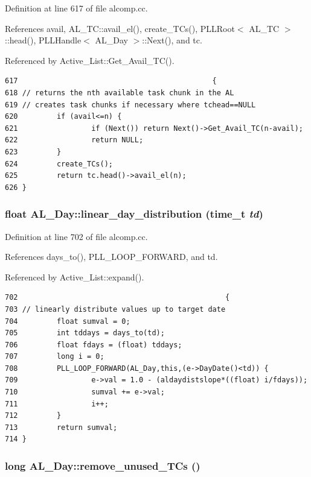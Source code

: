 Definition at line 617 of file alcomp.cc.

References avail, AL\_\-TC::avail\_\-el(), create\_\-TCs(), PLLRoot$<$ AL\_\-TC $>$::head(), PLLHandle$<$ AL\_\-Day $>$::Next(), and tc.

Referenced by Active\_\-List::Get\_\-Avail\_\-TC().



\footnotesize\begin{verbatim}617                                             {
618 // returns the nth available task chunk in the AL
619 // creates task chunks if necessary where tchead==NULL
620         if (avail<=n) {
621                 if (Next()) return Next()->Get_Avail_TC(n-avail);
622                 return NULL;
623         }
624         create_TCs();
625         return tc.head()->avail_el(n);
626 }
\end{verbatim}\normalsize 
{}
\subsubsection{\setlength{\rightskip}{0pt plus 5cm}float AL\_\-Day::linear\_\-day\_\-distribution (time\_\-t {\em td})}\label{classAL__Day_a26}




Definition at line 702 of file alcomp.cc.

References days\_\-to(), PLL\_\-LOOP\_\-FORWARD, and td.

Referenced by Active\_\-List::expand().



\footnotesize\begin{verbatim}702                                                {
703 // linearly distribute values up to target date
704         float sumval = 0;
705         int tddays = days_to(td);
706         float fdays = (float) tddays;
707         long i = 0;
708         PLL_LOOP_FORWARD(AL_Day,this,(e->DayDate()<td)) {
709                 e->val = 1.0 - (aldaydistslope*((float) i/fdays));
710                 sumval += e->val;
711                 i++;
712         }
713         return sumval;
714 }
\end{verbatim}\normalsize 
{}
\subsubsection{\setlength{\rightskip}{0pt plus 5cm}long AL\_\-Day::remove\_\-unused\_\-TCs ()}\label{classAL__Day_a25}





